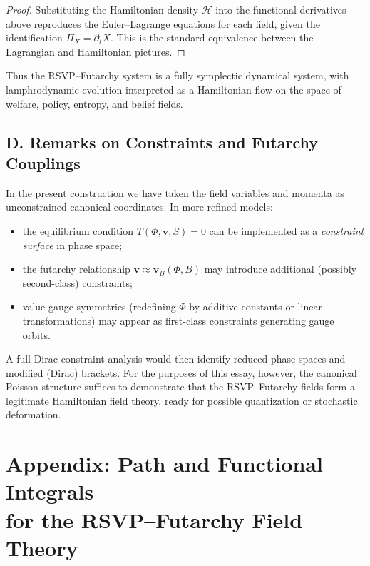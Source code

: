 \documentclass[12pt]{article}
\begin{document}
\begin{proof}
Substituting the Hamiltonian density $\mathcal{H}$ into the functional
derivatives above reproduces the Euler--Lagrange equations for each
field, given the identification $\Pi_X = \partial_t X$. This is the
standard equivalence between the Lagrangian and Hamiltonian pictures.
\end{proof}

Thus the RSVP--Futarchy system is a fully symplectic dynamical system,
with lamphrodynamic evolution interpreted as a Hamiltonian flow on the
space of welfare, policy, entropy, and belief fields.

\subsection*{D. Remarks on Constraints and Futarchy Couplings}

In the present construction we have taken the field variables and
momenta as unconstrained canonical coordinates. In more refined models:
\begin{itemize}
    \item the equilibrium condition $T(\Phi,\mathbf{v},S)=0$ can be
    implemented as a \emph{constraint surface} in phase space;
    \item the futarchy relationship 
    $\mathbf{v} \approx \mathbf{v}_B(\Phi,B)$ may introduce additional
    (possibly second-class) constraints;
    \item value-gauge symmetries (redefining $\Phi$ by additive
    constants or linear transformations) may appear as first-class
    constraints generating gauge orbits.
\end{itemize}

A full Dirac constraint analysis would then identify reduced phase
spaces and modified (Dirac) brackets. For the purposes of this essay,
however, the canonical Poisson structure suffices to demonstrate that
the RSVP--Futarchy fields form a legitimate Hamiltonian field theory,
ready for possible quantization or stochastic deformation.


\section*{Appendix: Path and Functional Integrals\\
for the RSVP--Futarchy Field Theory}
\end{document}
